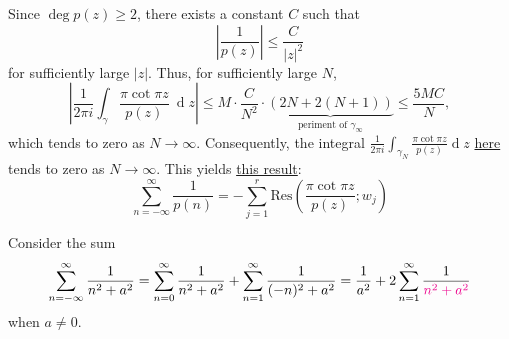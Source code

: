 \documentclass[12pt]{article}
\renewcommand{\d}{\ensuremath{\operatorname{d}}}
\begin{document}
Since $\deg p(z)\geq2$, there exists a constant $C$ such that
$$\left|\frac{1}{p(z)}\right|\leq\frac{C}{|z|^{2}}$$
for sufficiently large $|z|$. Thus, for sufficiently large $N$,
$$\left|\frac{1}{2\pi i}\int_{\gamma}\frac{\pi\cot\pi z}{p(z)}\ \d z\right|\leq M\cdot\frac{C}{N^{2}}\cdot\underbrace{(2N+2(N+1))}_{\text{periment of $\gamma_{\infty}$}}\leq\frac{5MC}{N},$$
which tends to zero as $N\to\infty$. Consequently, the integral ${\frac{1}{2\pi i}}\int_{\gamma_{N}}{\frac{\pi\cot\pi z}{p(z)}}\d z$ \hyperlink{cotangent-integral}{here} tends to zero as $N\to\infty$. This yields \hyperlink{integral-of-1-over-pn}{this result}:\[\sum_{n=-\infty}^{\infty}{\frac{1}{p(n)}}=-\sum_{j=1}^{r}\mathrm{Res}\left({\frac{\pi\cot\pi z}{p(z)}};w_{j}\right)\]

\eg Consider the sum \[\sum_{n=-\infty}^{\infty}\frac{1}{n^2+a^2} = \sum_{n=0}^{\infty}\frac{1}{n^2+a^2}+\sum_{n=1}^{\infty}\frac{1}{(-n)^2+a^2}= \frac{1}{a^2} +2\sum_{n=1}^{\infty}\frac{1}{\textcolor{magenta}{n^2+a^2}}\] when $a\neq 0$.
\end{document}

